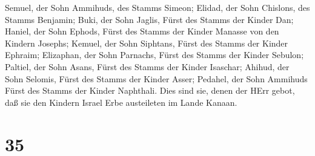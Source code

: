 Semuel, der Sohn Ammihuds, des Stamms Simeon;  Elidad, der
Sohn Chislons, des Stamms Benjamin;  Buki, der Sohn Jaglis,
Fürst des Stamms der Kinder Dan;  Haniel, der Sohn Ephods,
Fürst des Stamms der Kinder Manasse von den Kindern Josephs;
 Kemuel, der Sohn Siphtans, Fürst des Stamms der Kinder
Ephraim;  Elizaphan, der Sohn Parnachs, Fürst des Stamms
der Kinder Sebulon;  Paltiel, der Sohn Asans, Fürst des
Stamms der Kinder Isaschar;  Ahihud, der Sohn Selomis,
Fürst des Stamms der Kinder Asser;  Pedahel, der Sohn
Ammihuds Fürst des Stamms der Kinder Naphthali.  Dies sind
sie, denen der HErr gebot, daß sie den Kindern Israel Erbe austeileten
im Lande Kanaan.

\hypertarget{section-34}{%
\section{35}\label{section-34}}

